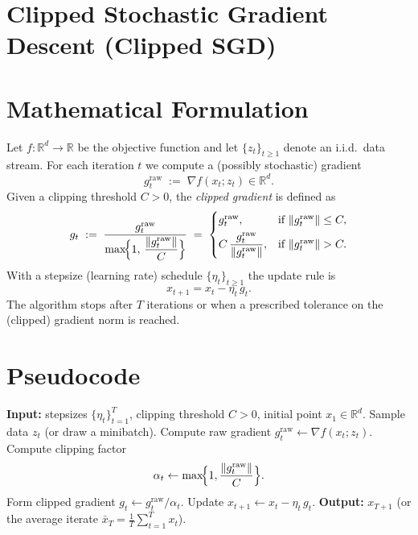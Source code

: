\documentclass{article}
\begin{document}
\section*{Clipped Stochastic Gradient Descent (Clipped SGD)}

\section*{Mathematical Formulation}
Let $f:\mathbb{R}^d\rightarrow\mathbb{R}$ be the objective function and let
$\{z_t\}_{t\ge 1}$ denote an i.i.d.\ data stream.
For each iteration $t$ we compute a (possibly stochastic) gradient
\[
g_t^{\text{raw}} \;:=\; \nabla f(x_t;z_t)\in\mathbb{R}^d .
\]
Given a clipping threshold $C>0$, the \emph{clipped gradient} is defined as
\begin{equation}
\label{eq:clipped}
g_t \;:=\;
\frac{g_t^{\text{raw}}}{\displaystyle \max\!\Bigl\{1,\,
\frac{\|g_t^{\text{raw}}\|}{C}\Bigr\}}
\;=\;
\begin{cases}
g_t^{\text{raw}}, & \text{if }\|g_t^{\text{raw}}\|\le C,\\[4pt]
C\,\dfrac{g_t^{\text{raw}}}{\|g_t^{\text{raw}}\|}, & \text{if }\|g_t^{\text{raw}}\|> C .
\end{cases}
\end{equation}
With a stepsize (learning rate) schedule $\{\eta_t\}_{t\ge 1}$ the update rule is
\begin{equation}
\label{eq:update}
x_{t+1}=x_t-\eta_t\, g_t .
\end{equation}
The algorithm stops after $T$ iterations or when a prescribed tolerance
on the (clipped) gradient norm is reached.

\section*{Pseudocode}
\begin{algorithm}[H]
\caption{Clipped SGD}
\begin{algorithmic}[1]
\State \textbf{Input:} stepsizes $\{\eta_t\}_{t=1}^T$, clipping threshold $C>0$, initial point $x_1\in\mathbb{R}^d$.
    \State Sample data $z_t$ (or draw a minibatch).
    \State Compute raw gradient $g_t^{\text{raw}} \gets \nabla f(x_t;z_t)$.
    \State Compute clipping factor 
    \[
        \alpha_t \gets \max\!\Bigl\{1,\frac{\|g_t^{\text{raw}}\|}{C}\Bigr\}.
    \]
    \State Form clipped gradient $g_t \gets g_t^{\text{raw}}/\alpha_t$.
    \State Update $x_{t+1} \gets x_t - \eta_t\, g_t$.
\EndFor
\State \textbf{Output:} $x_{T+1}$ (or the average iterate $\bar x_T=\frac1T\sum_{t=1}^T x_t$).
\end{algorithmic}
\end{algorithm}
\end{document}
